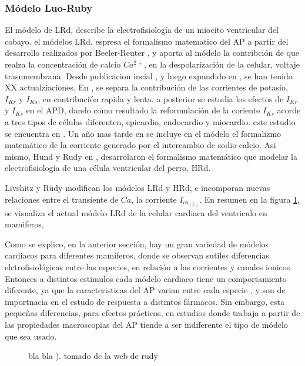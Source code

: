 \subsubsection{Módelo Luo-Ruby}

El módelo de \acf{LRd}, describe la electrofisiología de un miocito ventricular
del cobayo. el módelos \ac{LRd}, espresa el formalísmo matematico del \ac{AP} a
partir del desarrollo realizados por Beeler-Reuter \cite{beeler1977}, y aporta
al módelo la contribción de que realza la concentración de calcio $Ca^{2+}$,
en la despolarización de la celular, voltaje trasnmembrana. Desde publicacion
incial \cite{luo1991}, y luego expandido en  \cite{luo1994}, se han tenido XX
actualziaciones.  En \cite{zeng1995}, se separa la contribución de las
corrientes de potasio, $I_{Kr}$ y $I_{Ks}$, en contribución rapida y lenta.
a posterior se estudia los efectos de $I_{Kr}$ y $I_{Ks}$  en el \ac{APD}, dando
como resultado la reformulación de la coriente $I_{Ks}$ acorde a tres tipos de
células diferenten, epicardio, endocardio  y miocardio. este estudio se
encuentra en \cite{viswanathan1999}. Un año mas tarde en \cite{faber2000} se
incluye en el módelo el formalizmo matemático de la corriente generado por el intercambio de
sodio-calcio. Asi mismo, Hund y Rudy en \cite{hund2004}, desarrolaron el
formalismo matemático que modelar la electrofisiología de una célula ventricular
del perro, \ac{HRd}.

 Livshitz y  Rudy \cite{livshitz2007}  modifican los módelos \ac{LRd} y
 \ac{HRd}, e incomporan nuevas relaciones entre el transiente de $Ca$, la
 corriente $I_{ca_{(L)}}$. En resumen en la figura \ref{fig:modelHRd}, se
 visualiza el actual módelo  \ac{LRd} de la celular cardiaca del ventriculo en
 mamiferos,

 Como se explico, en la anterior sección, hay un gran variedad de  módelos
 cardiacos para diferentes mamiferos, donde se observan sutiles diferencias
 elctrofisiológicas entre las especies, en relación a las corrientes y
 canales ionicos. Entonces a distintos estimulos cada módelo cardiaco
 tiene un comportamiento diferente, ya que la caracteristicas del \ac{AP}
 varian entre cada especie \cite{OHara2012}, y son de  importnacia en el estudo
 de respuesta a distintos fármacos. Sin embargo, esta pequeñas diferencias,
 para efectos prácticos, en estudios donde trabaja a partir de las propiedades
 macroscopias del \ac{AP} tiende a ser indiferente el tipo de módelo que sea
 usado.

  \begin{figure}[t]
\centering
\caption{bla bla ). tomado de la web de rudy }
  \label{fig:modelHRd}
\end{figure}


